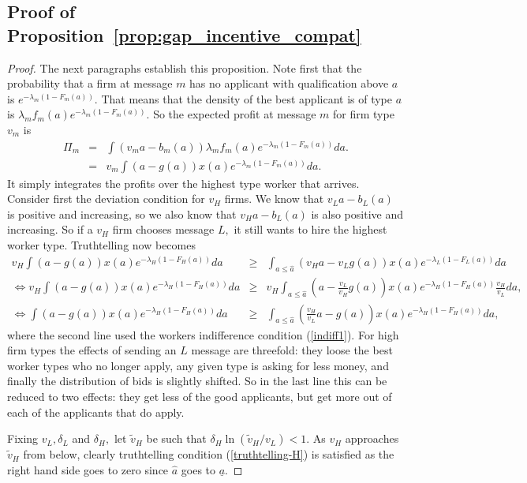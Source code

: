 \documentclass[12pt]{article}
\begin{document}
\subsection{Proof of Proposition~\ref{prop:gap_incentive_compat}}
\begin{proof}
The next paragraphs establish this proposition.
Note first that the probability that a firm at message $m$ has no applicant with qualification
above $a$ is $e^{-\lambda _{m}(1-F_{m}(a))}.$ That means that the density of
the best applicant is of type $a$ is $\lambda _{m}f_{m}(a)e^{-\lambda
_{m}(1-F_{m}(a))}.$ So the expected profit at message $m$ for firm type $%
v_{m}$ is 
\begin{eqnarray*}
\Pi _{m} &=&\int (v_{m}a-b_{m}(a))\lambda _{m}f_{m}(a)e^{-\lambda
_{m}(1-F_{m}(a))}da. \\
&=&v_{m}\int (a-g(a))x(a)e^{-\lambda _{m}(1-F_{m}(a))}da.
\end{eqnarray*}%
It simply integrates the profits over the highest type worker that arrives.
Consider first the deviation condition for $v_{H}$ firms. We know that $v_{L}a-b_{L}(a)$ is positive and increasing, so we also know that $v_{H}a-b_{L}(a)$ is also positive and increasing. So if a $v_{H}$ firm chooses message $L,$ it still wants to hire the highest worker type.
Truthtelling now becomes%
\begin{eqnarray}
v_{H}\int (a-g(a))x(a)e^{-\lambda _{H}(1-F_{H}(a))}da &\geq &\int_{a\leq 
\hat{a}}(v_{H}a-v_{L}g(a))x(a)e^{-\lambda _{L}(1-F_{L}(a))}da  \nonumber \\
\Longleftrightarrow v_{H}\int (a-g(a))x(a)e^{-\lambda _{H}(1-F_{H}(a))}da
&\geq &v_{H}\int_{a\leq \hat{a}}(a-\frac{v_{L}}{v_{H}}g(a))x(a)e^{-\lambda
_{H}(1-F_{H}(a))}\frac{v_{H}}{v_{L}}da,  \nonumber \\
\Longleftrightarrow \int (a-g(a))x(a)e^{-\lambda _{H}(1-F_{H}(a))}da &\geq
&\int_{a\leq \hat{a}}(\frac{v_{H}}{v_{L}}a-g(a))x(a)e^{-\lambda
_{H}(1-F_{H}(a))}da,  \label{truthtelling-H}
\end{eqnarray}%
where the second line used the workers indifference condition (\ref{indiff1}).
For high firm types the effects of sending an $L$ message are threefold:
they loose the best worker types who no longer apply, any given type is asking for less money, and finally the distribution of bids is slightly shifted. So in the last line this can be reduced to two effects: they get less of the good applicants, but get more out of each of the applicants that do apply.

Fixing $v_{L},\delta _{L}$ and $\delta _{H},$ let $\tilde{v}_{H}$ be such that $\delta _{H}\ln (\tilde{v}_{H}/v_{L})<1.$ As $v_{H}$ approaches $\tilde{v}_{H}$ from below, clearly truthtelling condition (\ref{truthtelling-H}) is satisfied as the right hand side goes to zero since $\hat{a}$ goes to $\underline{a}.$


\end{proof}
\end{document}
